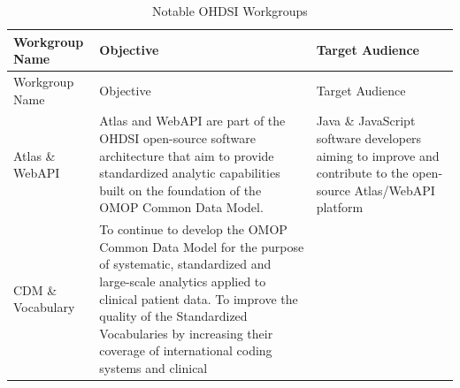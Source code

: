\documentclass[11pt]{book}
\theoremstyle{definition}
\theoremstyle{definition}
\theoremstyle{definition}
\theoremstyle{remark}
\begin{document}
\begin{longtable}[]{@{}lll@{}}
\caption{\label{tab:OHDSIworkgroups} Notable OHDSI
Workgroups}\tabularnewline
\toprule
\begin{minipage}[b]{0.08\columnwidth}\raggedright\strut
Workgroup Name\strut
\end{minipage} & \begin{minipage}[b]{0.25\columnwidth}\raggedright\strut
Objective\strut
\end{minipage} & \begin{minipage}[b]{0.14\columnwidth}\raggedright\strut
Target Audience\strut
\end{minipage}\tabularnewline
\midrule
\endfirsthead
\toprule
\begin{minipage}[b]{0.08\columnwidth}\raggedright\strut
Workgroup Name\strut
\end{minipage} & \begin{minipage}[b]{0.25\columnwidth}\raggedright\strut
Objective\strut
\end{minipage} & \begin{minipage}[b]{0.14\columnwidth}\raggedright\strut
Target Audience\strut
\end{minipage}\tabularnewline
\midrule
\endhead
\begin{minipage}[t]{0.08\columnwidth}\raggedright\strut
Atlas \& WebAPI\strut
\end{minipage} & \begin{minipage}[t]{0.25\columnwidth}\raggedright\strut
Atlas and WebAPI are part of the OHDSI open-source software architecture
that aim to provide standardized analytic capabilities built on the
foundation of the OMOP Common Data Model.\strut
\end{minipage} & \begin{minipage}[t]{0.14\columnwidth}\raggedright\strut
Java \& JavaScript software developers aiming to improve and contribute
to the open-source Atlas/WebAPI platform\strut
\end{minipage}\tabularnewline
\begin{minipage}[t]{0.08\columnwidth}\raggedright\strut
CDM \& Vocabulary\strut
\end{minipage} & \begin{minipage}[t]{0.25\columnwidth}\raggedright\strut
To continue to develop the OMOP Common Data Model for the purpose of
systematic, standardized and large-scale analytics applied to clinical
patient data. To improve the quality of the Standardized Vocabularies by
increasing their coverage of international coding systems and clinical

\end{minipage}
\end{longtable}
\end{document}
